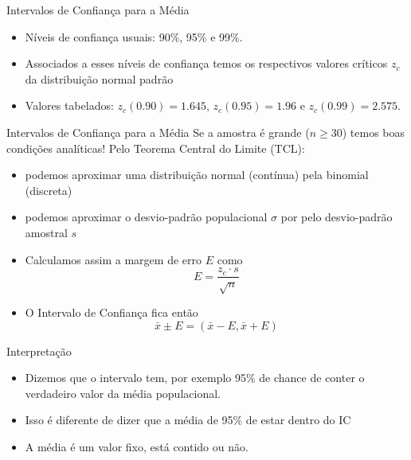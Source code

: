 \documentclass{beamer}
\begin{document}
\begin{frame}{Intervalos de Confiança para a Média}
  \begin{itemize}
  \item Níveis de confiança usuais: 90\%, 95\% e 99\%.
  \item Associados a esses níveis de confiança temos os respectivos
    valores críticos $z_c$ da distribuição normal padrão
  \item Valores tabelados: $z_c(0.90) = 1.645$, $z_c(0.95)=1.96$ e
    $z_c(0.99)=2.575$.
  \end{itemize}
\end{frame}


\begin{frame}{Intervalos de Confiança para a Média}
  Se a amostra é grande ($n \ge 30$) temos boas condições analíticas!
  Pelo Teorema Central do Limite (TCL):
  \begin{itemize}
  \item podemos aproximar uma distribuição normal (contínua) pela
    binomial (discreta)
  \item podemos aproximar o desvio-padrão populacional $\sigma$ por
    pelo desvio-padrão amostral $s$
  \item Calculamos assim a margem de erro $E$ como
    \begin{displaymath}
      E = \frac{z_c \cdot s}{\sqrt{n}}
    \end{displaymath}
  \item O Intervalo de Confiança fica então
    \begin{displaymath}
      \bar{x} \pm E = (\bar{x}-E , \bar{x} +E)      
    \end{displaymath}
  \end{itemize}
\end{frame}

\begin{frame}{Interpretação}
  \begin{itemize}
  \item Dizemos que o intervalo tem, por exemplo 95\% de chance de
    conter o verdadeiro valor da média populacional.
  \item Isso é diferente de dizer que a média de 95\% de estar dentro
    do IC
  \item A média é um valor fixo, está contido ou não.
  \end{itemize}
\end{frame}
\end{document}
